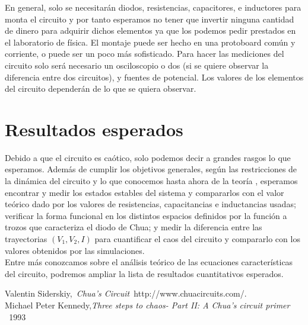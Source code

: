 \documentclass[%
 reprint,
%
 amsmath,amssymb,
 aps,
]{revtex4-1}
\begin{document}
En general, solo se necesitarán diodos, resistencias, capacitores, e inductores para monta el circuito y por tanto esperamos no tener que invertir ninguna cantidad de dinero para adquirir dichos elementos ya que los podemos pedir prestados en el laboratorio de física. El montaje puede ser hecho en una protoboard común y corriente, o puede ser un poco más sofisticado. Para hacer las mediciones del circuito solo será necesario un osciloscopio o dos (si se quiere observar la diferencia entre dos circuitos), y fuentes de potencial. Los valores de los elementos del circuito dependerán de lo que se quiera observar.

\section{\label{sec:level1}Resultados esperados}
 Debido a que el circuito es caótico, solo podemos decir a grandes rasgos lo que esperamos. Además de cumplir los objetivos generales, según las restricciones de la dinámica del circuito y lo que conocemos hasta ahora de la teoría \cite{Paper}, esperamos encontrar y medir los estados estables del sistema y compararlos con el valor teórico dado por los valores de resistencias, capacitancias e inductancias usadas; verificar la forma funcional en los distintos espacios definidos por la función a trozos que caracteriza el diodo de Chua; y medir la diferencia entre las trayectorias $(V_1, V_2, I)$ para cuantificar el caos del circuito y compararlo con los valores obtenidos por las simulaciones.\\
 
Entre más conozcamos sobre el análisis teórico de las ecuaciones características del circuito, podremos ampliar la lista de resultados cuantitativos esperados.\\

\begin{thebibliography}{99} 
Valentin Siderskiy,{\it \ Chua's Circuit\ }{http://www.chuacircuits.com/}.\\ 
 Michael Peter Kennedy,{\it Three steps to chaos- Part II: A Chua's circuit primer \ }{1993}\\ \end{thebibliography}
\end{document}
